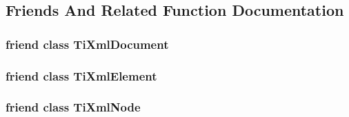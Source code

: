 \subsection{Friends And Related Function Documentation}
\hypertarget{class_ti_xml_base_a173617f6dfe902cf484ce5552b950475}{
\subsubsection[{Ti\+Xml\+Document}]{\setlength{\rightskip}{0pt plus 5cm}friend class {\bf Ti\+Xml\+Document}\hspace{0.3cm}{\ttfamily [friend]}}}\label{class_ti_xml_base_a173617f6dfe902cf484ce5552b950475}
\hypertarget{class_ti_xml_base_ab6592e32cb9132be517cc12a70564c4b}{
\subsubsection[{Ti\+Xml\+Element}]{\setlength{\rightskip}{0pt plus 5cm}friend class {\bf Ti\+Xml\+Element}\hspace{0.3cm}{\ttfamily [friend]}}}\label{class_ti_xml_base_ab6592e32cb9132be517cc12a70564c4b}
\hypertarget{class_ti_xml_base_a218872a0d985ae30e78c55adc4bdb196}{
\subsubsection[{Ti\+Xml\+Node}]{\setlength{\rightskip}{0pt plus 5cm}friend class {\bf Ti\+Xml\+Node}\hspace{0.3cm}{\ttfamily [friend]}}}\label{class_ti_xml_base_a218872a0d985ae30e78c55adc4bdb196}


